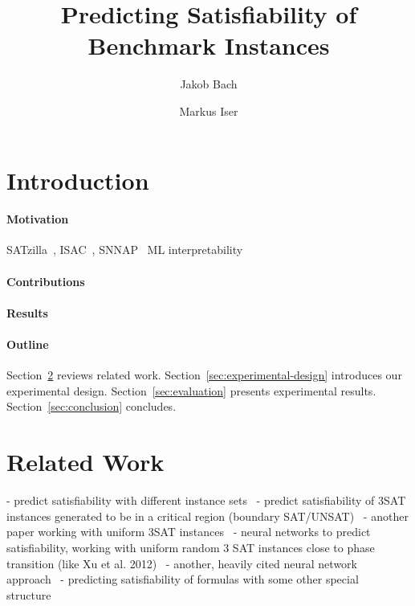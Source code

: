 \documentclass{article}
\title{Predicting Satisfiability of Benchmark Instances}
\author{Jakob Bach \and Markus Iser}
\begin{document}
\maketitle

\begin{abstract}

\end{abstract}

\section{Introduction}
\label{sec:introduction}

\paragraph{Motivation}

SATzilla~\cite{xu2008satzilla, xu2012satzilla2012}, ISAC~\cite{kadioglu2010isac}, SNNAP~\cite{collautti2013snnap}
ML interpretability~\cite{carvalho2019machine, gilpin2018explaining}

\paragraph{Contributions}

\paragraph{Results}

\paragraph{Outline}

Section~\ref{sec:related-work} reviews related work.
Section~\ref{sec:experimental-design} introduces our experimental design.
Section~\ref{sec:evaluation} presents experimental results.
Section~\ref{sec:conclusion} concludes.

\section{Related Work}
\label{sec:related-work}

- predict satisfiability with different instance sets~\cite{devlin2008satisfiability}
- predict satisfiability of 3SAT instances generated to be in a critical region (boundary SAT/UNSAT)~\cite{xu2012predicting}
- another paper working with uniform 3SAT instances~\cite{leyton2014understanding}
- neural networks to predict satisfiability, working with uniform random 3 SAT instances close to phase transition (like Xu et al. 2012)~\cite{cameron2020predicting}
- another, heavily cited neural network approach~\cite{selsam2018learning}
- predicting satisfiability of formulas with some other special structure~\cite{elhalaby2020learning}
\end{document}
